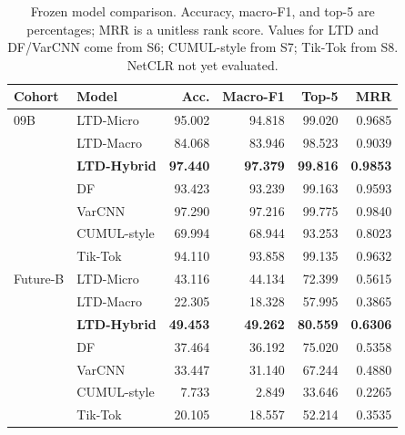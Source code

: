 \begin{table}[htbp]
\centering
\small
\caption{Frozen model comparison. Accuracy, macro-F1, and top-5 are percentages; MRR is a unitless rank score. Values for LTD and DF/VarCNN come from S6; CUMUL-style from S7; Tik-Tok from S8. NetCLR not yet evaluated.}
\label{tab:main}
\setlength{\tabcolsep}{4pt}
\begin{tabular}{llrrrr}
\toprule
Cohort & Model & Acc. & Macro-F1 & Top-5 & MRR \\
\midrule
09B & LTD-Micro & 95.002 & 94.818 & 99.020 & 0.9685 \\
 & LTD-Macro & 84.068 & 83.946 & 98.523 & 0.9039 \\
 & \textbf{LTD-Hybrid} & \textbf{97.440} & \textbf{97.379} & \textbf{99.816} & \textbf{0.9853} \\
 & DF & 93.423 & 93.239 & 99.163 & 0.9593 \\
 & VarCNN & 97.290 & 97.216 & 99.775 & 0.9840 \\
 & CUMUL-style & 69.994 & 68.944 & 93.253 & 0.8023 \\
 & Tik-Tok & 94.110 & 93.858 & 99.135 & 0.9632 \\
\midrule
Future-B & LTD-Micro & 43.116 & 44.134 & 72.399 & 0.5615 \\
 & LTD-Macro & 22.305 & 18.328 & 57.995 & 0.3865 \\
 & \textbf{LTD-Hybrid} & \textbf{49.453} & \textbf{49.262} & \textbf{80.559} & \textbf{0.6306} \\
 & DF & 37.464 & 36.192 & 75.020 & 0.5358 \\
 & VarCNN & 33.447 & 31.140 & 67.244 & 0.4880 \\
 & CUMUL-style & 7.733 & 2.849 & 33.646 & 0.2265 \\
 & Tik-Tok & 20.105 & 18.557 & 52.214 & 0.3535 \\
\bottomrule
\end{tabular}
\end{table}
